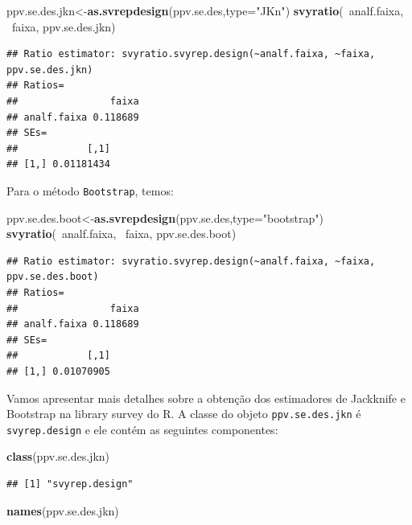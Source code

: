 \documentclass[]{book}
\newenvironment{Shaded}{\begin{snugshade}}{\end{snugshade}}
\newcommand{\KeywordTok}[1]{\textcolor[rgb]{0.13,0.29,0.53}{\textbf{{#1}}}}
\newcommand{\DataTypeTok}[1]{\textcolor[rgb]{0.13,0.29,0.53}{{#1}}}
\newcommand{\StringTok}[1]{\textcolor[rgb]{0.31,0.60,0.02}{{#1}}}
\newcommand{\NormalTok}[1]{{#1}}
\numberwithin{example}{chapter}
\numberwithin{remark}{chapter}
\numberwithin{definition}{chapter}
\begin{document}
\begin{Shaded}
\begin{Highlighting}[]
\NormalTok{ppv.se.des.jkn<-}\KeywordTok{as.svrepdesign}\NormalTok{(ppv.se.des,}\DataTypeTok{type=}\StringTok{"JKn"}\NormalTok{)}
\KeywordTok{svyratio}\NormalTok{(~analf.faixa, ~faixa, ppv.se.des.jkn)}
\end{Highlighting}
\end{Shaded}

\begin{verbatim}
## Ratio estimator: svyratio.svyrep.design(~analf.faixa, ~faixa, ppv.se.des.jkn)
## Ratios=
##                faixa
## analf.faixa 0.118689
## SEs=
##            [,1]
## [1,] 0.01181434
\end{verbatim}

Para o método \texttt{Bootstrap}, temos:

\begin{Shaded}
\begin{Highlighting}[]
\NormalTok{ppv.se.des.boot<-}\KeywordTok{as.svrepdesign}\NormalTok{(ppv.se.des,}\DataTypeTok{type=}\StringTok{"bootstrap"}\NormalTok{)}
\KeywordTok{svyratio}\NormalTok{(~analf.faixa, ~faixa, ppv.se.des.boot)}
\end{Highlighting}
\end{Shaded}

\begin{verbatim}
## Ratio estimator: svyratio.svyrep.design(~analf.faixa, ~faixa, ppv.se.des.boot)
## Ratios=
##                faixa
## analf.faixa 0.118689
## SEs=
##            [,1]
## [1,] 0.01070905
\end{verbatim}

Vamos apresentar mais detalhes sobre a obtenção dos estimadores de
Jackknife e Bootstrap na library survey do R. A classe do objeto
\texttt{ppv.se.des.jkn} é \texttt{svyrep.design} e ele contém as
seguintes componentes:

\begin{Shaded}
\begin{Highlighting}[]
\KeywordTok{class}\NormalTok{(ppv.se.des.jkn)}
\end{Highlighting}
\end{Shaded}

\begin{verbatim}
## [1] "svyrep.design"
\end{verbatim}

\begin{Shaded}
\begin{Highlighting}[]
\KeywordTok{names}\NormalTok{(ppv.se.des.jkn)}
\end{Highlighting}
\end{Shaded}
\end{document}
